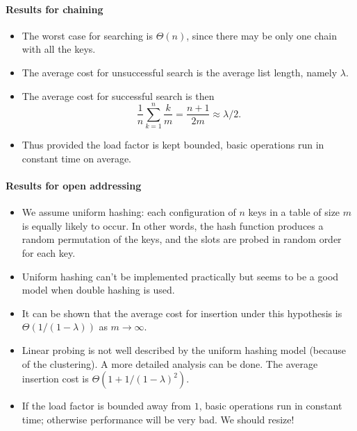 % 


\paragraph{Results for chaining}
\begin{itemize}
\item The worst case for searching is $\Theta(n)$, since there may be only one 
chain with all the keys.
\item The average cost for unsuccessful search is the average list length, 
namely $\lambda$.
\item The average cost for successful search is then 
$$
\frac{1}{n} \sum_{k=1}^n \frac{k}{m} = \frac{n+1}{2m} \approx \lambda/2.
$$
\item Thus provided the load factor is kept bounded, basic operations run in 
constant time on average. 
\end{itemize}

\paragraph{Results for open addressing}
\begin{itemize}
\item We assume {uniform hashing}: each configuration of 
$n$ keys in a table of size $m$ is equally likely to occur. In other words, the 
hash function produces a random permutation of the keys, and the slots are 
probed in random order for each key.
\item Uniform hashing can't be implemented practically but seems to be a good 
model when double hashing is used.
\item It can be shown that the average cost for insertion under this 
hypothesis is $\Theta(1/(1-\lambda))$ as $m \to \infty$. 
\item Linear probing is not well described by the uniform hashing model 
(because of the clustering). A more detailed analysis can be done. 
The average insertion cost is $\Theta(1 + 1/(1 - \lambda)^2)$.
\item If the load factor is bounded away from $1$, basic operations 
run in constant time; otherwise performance will be very bad. We should resize!
\end{itemize}

